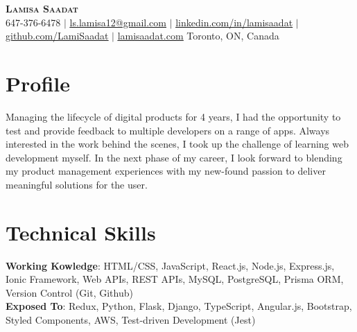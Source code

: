 \documentclass[letterpaper,11pt]{article}
\begin{document}

\begin{center}
    \textbf{\Huge \scshape Lamisa Saadat} \\ \vspace{1pt}
    \small 647-376-6478 $|$
    \href{mailto:ls.lamisa12@gmail.com}{\underline{ls.lamisa12@gmail.com}} $|$ 
    \href{http://www.linkedin.com/in/lamisaadat}{\underline{linkedin.com/in/lamisaadat}} $|$
    \href{https://github.com/LamiSaadat}{\underline{github.com/LamiSaadat}} $|$
    \href{www.lamisaadat.com}{\underline{lamisaadat.com}}
    \newline\small Toronto, ON, Canada
\end{center}

\section{Profile}
 \begin{itemize}[leftmargin=0.15in, label={}]
    \small{\item{
     {Managing the lifecycle of digital products for 4 years, I had the opportunity to test and provide feedback to multiple developers on a range of apps. Always interested in the work behind the scenes, I took up the challenge of learning web development myself. In the next phase of my career, I look forward to blending my product management experiences with my new-found passion to deliver meaningful solutions for the user.} \\
    }}
 \end{itemize}

\section{Technical Skills}
 \begin{itemize}[leftmargin=0.15in, label={}]
    \small{\item{
     \textbf{Working Kowledge}{: HTML/CSS, JavaScript, React.js, Node.js, Express.js, Ionic Framework, Web APIs, REST APIs, MySQL, PostgreSQL, Prisma ORM, Version Control (Git, Github)} \\
     \textbf{Exposed To}{: Redux, Python, Flask, Django, TypeScript, Angular.js, Bootstrap, Styled Components, AWS, Test-driven Development (Jest)} \\
    }}
 \end{itemize}
\end{document}
